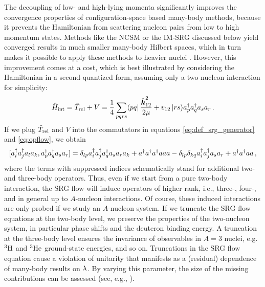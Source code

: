 The decoupling of low- and high-lying momenta significantly improves the convergence
properties of configuration-space based many-body methods, because it prevents the 
Hamiltonian from scattering nucleon pairs from low to high momentum states. Methods 
like the NCSM or the IM-SRG discussed below yield converged results in much smaller 
many-body Hilbert spaces, which in turn makes it possible to
apply these methods to heavier nuclei \cite{Roth:2011kx,Barrett:2013oq,Jurgenson:2013fk,Roth:2014fk,Hergert:2013ij,Hergert:2013mi,Hergert:2014vn,Hergert:2016jk,Hagen:2010uq,Roth:2012qf,Binder:2013zr,Binder:2014fk,Soma:2011vn,Soma:2013ys,Soma:2014fu,Soma:2014eu}.
 However, this improvement 
comes at a cost, which is best illustrated by considering the Hamiltonian in a 
second-quantized form, assuming only a two-nucleon interaction for simplicity:
\begin{equation}\label{eq:H}
  \Hint = \Trel + V = \frac{1}{4}\sum_{pqrs} \matrixe{pq}{\frac{\kOV_{12}^2}{2\mu}+v_{12}}{rs}\aaO_p\aaO_q\aO_s\aO_r\,.
\end{equation}
If we plug $\Trel$ and $V$ into the commutators in equations \eqref{eq:def_srg_generator} and 
\eqref{eq:opflow}, we obtain
\begin{equation}\label{eq:comm2B_vac}
  \comm{\aaO_i\aaO_j\aO_l\aO_k}{\aaO_p\aaO_q\aO_s\aO_r}=
  \delta_{lp}\aaO_i\aaO_j\aaO_q\aO_s\aO_r\aO_k + \aaO\aaO\aaO\aO\aO\aO
  -\delta_{lp}\delta_{kq}\aaO_i\aaO_j\aO_s\aO_r + \aaO\aaO\aO\aO\,, 
\end{equation}
where the terms with suppressed indices schematically stand for additional two- and
three-body operators. Thus, even if we start from a pure two-body interaction, the SRG 
flow will induce operators of higher rank, i.e., three-, four-, and in general 
up to $A$-nucleon interactions. Of course, these induced interactions 
are only probed if we study an $A$-nucleon system. If we truncate the SRG flow equations
at the two-body level, we preserve the properties of the two-nucleon system, in particular
phase shifts and the deuteron binding energy. A truncation at the three-body level 
ensures the invariance of observables in $A=3$ nuclei, 
e.g.~$\nuc{H}{3}$ and $\nuc{He}{3}$ ground-state energies, and so on. Truncations in the 
SRG flow equation cause a violation of unitarity that manifests as
a (residual) dependence of many-body results on $\lambdaSRG$. By varying this parameter, 
the size of the missing contributions can be assessed (see, e.g., \cite{Bogner:2010pq,
Jurgenson:2009bs,Hebeler:2012ly,Roth:2011kx,Hergert:2013mi,Hergert:2013ij,Binder:2014fk,
Soma:2014eu,Griesshammer:2015dp}).

